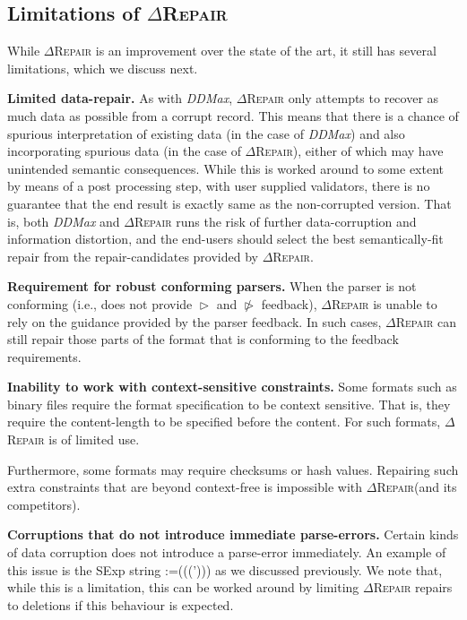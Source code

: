 \documentclass[acmsmall,screen,review,anonymous]{acmart}
\makeatletter
\newcommand{\revise}[1]{\textcolor{black}{#1}}
\def\Rincomplete{\texttt{\color{incompletecolor}\textbf{$\vartriangleright$}}\xspace}
\def\Rincorrect{\texttt{\color{incorrectcolor}\textbf{$\ntriangleright$}}\xspace}
\newcommand{\approach}{\textsc{$\Delta$Repair}\xspace}
\newcommand{\ddmax}{\textit{DDMax}\xspace}
\newcommand{\drepair}{\approach}
\newcommand\letterboxed[1]{%
\setlength{\fboxsep}{0pt}%
  \@tfor\@ii:=#1\do{%
    \fcolorbox{light-gray}{white}%
    {\texttt{\strut\@ii}}%
  }%
}
\makeatother
\begin{document}
\subsection{Limitations of \drepair}
While \drepair is an improvement over the state of the art, it still has
several limitations, which we discuss next.


\noindent\textbf{Limited data-repair.} As with \ddmax, \drepair only attempts
to recover as much data as possible from a corrupt record. This means that there
is a chance of spurious interpretation of existing data (in the case of \ddmax)
and also incorporating spurious data (in the case of \drepair), either of which
may have unintended semantic consequences. While this is
worked around to some extent by means of a post processing step, with user
supplied validators, there is no guarantee that the end result is exactly same
as the non-corrupted version. That is, both \ddmax and \drepair runs the risk
of further data-corruption and information distortion, and the end-users should
select the best semantically-fit repair from the repair-candidates provided by
\drepair.

\noindent\textbf{Requirement for robust conforming parsers.}
When the parser is not conforming (i.e., does not provide \Rincomplete and \Rincorrect feedback), \drepair is unable to rely on the
guidance provided by the parser feedback. In such cases, \drepair can
still repair those parts of the format that is conforming to the feedback
requirements.

\noindent\textbf{Inability to work with context-sensitive constraints.} 
Some formats such as binary files require the format specification to be
context sensitive. That is, they require the content-length to be specified
before the content. For such formats, \drepair is of limited use.

Furthermore,  some formats may require checksums or hash values. Repairing
such extra constraints that are beyond context-free is impossible with
\drepair (and its competitors).


\noindent\textbf{Corruptions that do not introduce immediate parse-errors.}
Certain kinds of data corruption does not introduce a parse-error immediately.
An example of this issue is the SExp string \letterboxed{(((')))} as we discussed
previously.
We note that, while this is a limitation, this can be worked around by limiting
\drepair repairs to deletions if this behaviour is expected.
\end{document}
